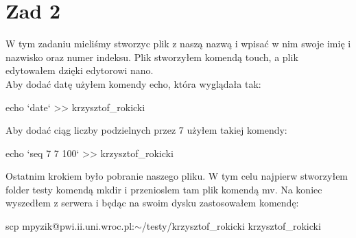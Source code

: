 \documentclass[a4paper,12pt]{article}
\begin{document}
\section{Zad 2}
W tym zadaniu mieliśmy stworzyc plik z naszą nazwą i wpisać w nim swoje imię i nazwisko oraz numer indeksu. Plik stworzyłem komendą touch, a plik edytowałem dzięki edytorowi nano.\\
Aby dodać datę użyłem komendy echo, która wyglądała tak:
\begin{center}
echo `date` >> krzysztof\_rokicki
\end{center}
Aby dodać ciąg liczby podzielnych przez 7 użyłem takiej komendy:
\begin{center}
echo `seq 7 7 100` >> krzysztof\_rokicki
\end{center} 
Ostatnim krokiem było pobranie naszego pliku. W tym celu najpierw stworzyłem folder testy komendą mkdir i przenioslem tam plik komendą mv. Na koniec wyszedłem z serwera i będąc na swoim dysku zastosowałem komendę:
\begin{center}
scp mpyzik@pwi.ii.uni.wroc.pl:$\sim$/testy/krzysztof\_rokicki krzysztof\_rokicki
\end{center}
\end{document}
